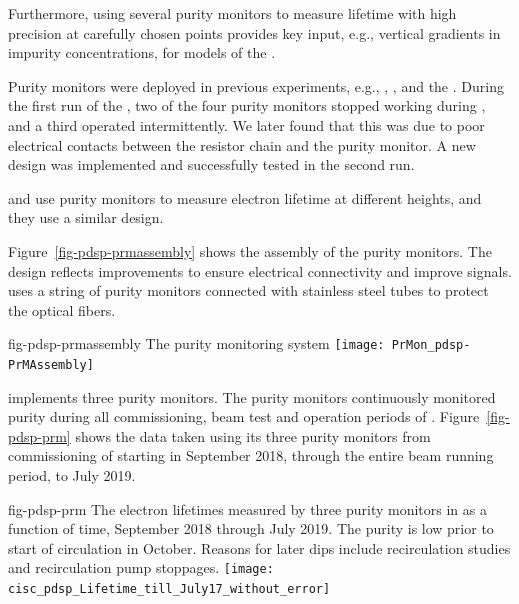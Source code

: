 Furthermore, using several purity monitors to measure lifetime with high precision at carefully chosen points provides key input, e.g.,  vertical gradients in impurity concentrations, for  models of the .

Purity monitors were deployed in previous  experiments, e.g., , , and the . During the first run of the , two of the four purity monitors stopped working during \cooldown, and a third operated intermittently. We later found that this was due to poor electrical contacts between the resistor chain and the purity monitor. A new design was implemented and successfully tested in the second run. 


 and  %
use purity monitors to %
measure electron lifetime at different heights, and they use a similar design. 

Figure~\ref{fig-pdsp-prmassembly} shows the assembly of the  purity monitors. The design reflects improvements to ensure electrical connectivity and improve signals.  uses a string of purity monitors connected with stainless steel tubes to protect the optical fibers. 

\begin{dunefigure}{fig-pdsp-prmassembly}
  {The  purity monitoring system}
  \texttt{[image: PrMon\_pdsp-PrMAssembly]}
\end{dunefigure}


 implements three purity monitors. The purity monitors continuously monitored  purity during all commissioning, beam test and operation periods of . Figure~\ref{fig-pdsp-prm} shows the  data taken using %
its three purity monitors from commissioning of  starting in September 2018, through the entire beam running period, to July 2019.

\begin{dunefigure}{fig-pdsp-prm}
  {The electron lifetimes measured by three purity monitors in  as a function of time, September 2018 through July 2019. The purity is low prior to start of circulation in October. Reasons for later dips include recirculation studies and recirculation pump stoppages.}
  \texttt{[image: cisc\_pdsp\_Lifetime\_till\_July17\_without\_error]}
\end{dunefigure}

